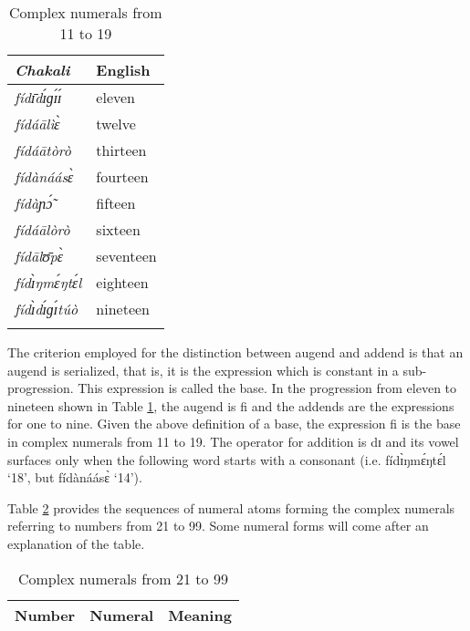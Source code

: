 \begin{exe}
\begin{exe}
\begin{exe}
{\begin{exe}
\begin{exe}
\begin{exe}
\begin{exe}
\begin{exe}
\begin{exe}
\begin{exe}
\begin{exe}
\begin{exe}
  \begin{table}[!h]
  \caption{Complex numerals from 11 to 19  \label{tab:numral11-19}}
   \centering

  \begin{tabular}{>{\slshape}ll}
\lsptoprule
 {\rm Chakali} & English\\ \midrule
 fídɪ̄dɪ́ɡɪ́ɪ́ & eleven\\
 fídáālìɛ̀ & twelve\\
  fídáātòrò &  thirteen\\
fídànáásɛ̀ &  fourteen\\
 fídàɲɔ̃́ &  fifteen\\
 fídáālòrò  & sixteen\\
fídālʊ̄pɛ̀ &  seventeen\\
  fídɪ̀ŋmɛ́ŋtɛ́l  &  eighteen\\
  fídɪ̀dɪ́ɡɪ́túò &  nineteen\\

\lspbottomrule
\end{tabular}
\end{table}

The criterion employed for  the distinction between augend and addend is that an
augend is serialized, that is, it is the expression which is constant in a
sub-progression. This expression is called the base. In the progression from 
eleven to nineteen shown  in  Table  \ref{tab:numral11-19},  the augend is 
{\sls 
fi} and the addends are the expressions for one to nine. Given the
above definition of a base,  the expression 
{\sls fi} is  the base in complex
numerals  from 11 to 19. The operator for
addition is {\sls dɪ} and its vowel surfaces only when the
 following word starts with a consonant (i.e. {\sls fídɪ̀ŋmɛ́ŋtɛ́l} `18', but
{\sls 
fídànáásɛ̀} `14').

Table \ref{tab:numeral21-99} provides the sequences of  numeral atoms forming the complex numerals 
referring to  numbers from 21 to 99. Some numeral  forms will come after an explanation of the 
table.



  \begin{table}[!h]
  \caption{Complex numerals from 21 to 99  \label{tab:numeral21-99}}
  \centering

  \begin{tabular}{lll}
\lsptoprule 
Number  & Numeral & Meaning\\ \midrule
 

\end{tabular}
\end{table}
\end{exe}
\end{exe}
\end{exe}
\end{exe}
\end{exe}
\end{exe}
\end{exe}
\end{exe}
\end{exe}}
\end{exe}
\end{exe}
\end{exe}
